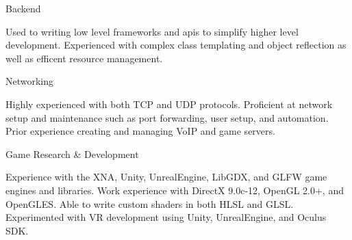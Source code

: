 \vspace{-3mm}

\begin{cventries}

  \cventry
    {}
    {Backend}
    {}
    {}
    {
      \vspace{-5mm}
      \begin{cvitems}
        \item {Used to writing low level frameworks and apis to simplify higher level development. %
        Experienced with complex class templating and object reflection as well as %
        efficent resource management.}
      \end{cvitems}
    }
    \vspace{-1.8mm}
    \cventry
      {}
      {Networking}
      {}
      {}
      {
        \vspace{-5mm}
        \begin{cvitems}
          \item {Highly experienced with both TCP and UDP protocols. %
          Proficient at network setup and maintenance such as port forwarding, user %
          setup, and automation. Prior experience creating and managing VoIP and game servers.}
        \end{cvitems}
      }
      \vspace{-1.8mm}
      \cventry
        {}
        {Game Research \& Development}
        {}
        {}
        {
          \vspace{-5mm}
          \begin{cvitems}
            \item {Experience with the XNA, Unity, UnrealEngine, LibGDX, and GLFW game engines and %
            libraries. Work experience with DirectX 9.0c-12, OpenGL 2.0+, and OpenGLES. Able %
            to write custom shaders in both HLSL and GLSL. Experimented with VR development %
            using Unity, UnrealEngine, and Oculus SDK.}
          \end{cvitems}
        }

\end{cventries}
\vspace{-5mm}
